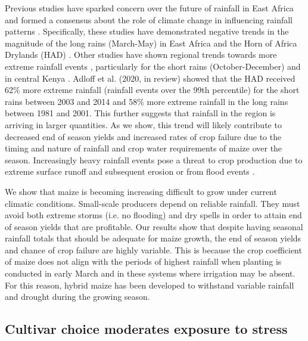 Previous studies have sparked concern over the future of rainfall in East Africa and formed a consensus about the role of climate change in influencing rainfall patterns \cite{nicholson2017climate, shongwe2011projected, adloff-inreview}. Specifically, these studies have demonstrated negative trends in the magnitude of the long rains (March-May) in East Africa and the Horn of Africa Drylands (HAD) \cite{lyon2012recent,liebmann2014understanding,williams2011westward, funk2018examining,funk2019recognizing}. Other studies have shown regional trends towards more extreme rainfall events \cite{harrison2019identifying}, particularly for the short rains (October-December) \cite{shongwe2011projected,adloff-inreview} and in central Kenya \cite{schmocker2016trends}. Adloff et al. (2020, in review) showed that the HAD received 62\% more extreme rainfall (rainfall events over the 99th percentile) for the short rains between 2003 and 2014 and 58\% more extreme rainfall in the long rains between 1981 and 2001. This further suggests that rainfall in the region is arriving in larger quantities. As we show, this trend will likely contribute to decreased end of season yields and increased rates of crop failure due to the timing and nature of rainfall and crop water requirements of maize over the season. Increasingly heavy rainfall events pose a threat to crop production due to extreme surface runoff and subsequent erosion or from flood events  \cite{liniger1998grass, liniger1998mountains}. 

We show that maize is becoming increasing difficult to grow under current climatic conditions. Small-scale producers depend on reliable rainfall. They must avoid both extreme storms (i.e. no flooding) and dry spells in order to attain end of season yields that are profitable. Our results show that despite having seasonal rainfall totals that should be adequate for maize growth, the end of season yields and chance of crop failure are highly variable. This is because the crop coefficient of maize does not align with the periods of highest rainfall when planting is conducted in early March and in these systems where irrigation may be absent. For this reason, hybrid maize has been developed to withstand variable rainfall and drought during the growing season.

\subsection{Cultivar choice moderates exposure to stress}

